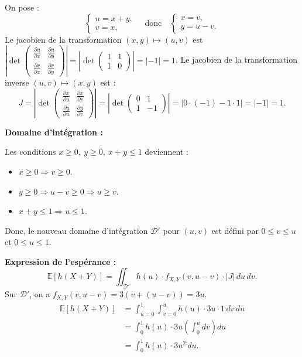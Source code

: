 {\begin{enumerate}
{			On pose :
			\[
			\begin{cases}
				u = x + y,\\
				v = x,
			\end{cases}
			\quad \text{donc} \quad
			\begin{cases}
				x = v,\\
				y = u - v.
			\end{cases}
			\]
			Le jacobien de la transformation $(x,y) \mapsto (u,v)$ est $\left| \det \begin{pmatrix} \frac{\partial u}{\partial x} & \frac{\partial u}{\partial y} \\ \frac{\partial v}{\partial x} & \frac{\partial v}{\partial y} \end{pmatrix} \right| = \left| \det \begin{pmatrix} 1 & 1 \\ 1 & 0 \end{pmatrix} \right| = |-1| = 1$.
			Le jacobien de la transformation inverse $(u,v) \mapsto (x,y)$ est :
			\[
			J = \left| \det
			\begin{pmatrix}
				\frac{\partial x}{\partial u} & \frac{\partial x}{\partial v} \\
				\frac{\partial y}{\partial u} & \frac{\partial y}{\partial v}
			\end{pmatrix}
			\right|
			= \left| \det
			\begin{pmatrix}
				0 & 1 \\
				1 & -1
			\end{pmatrix}
			\right| = |0 \cdot (-1) - 1 \cdot 1| = |-1| = 1.
			\]
			
			\textbf{Domaine d'intégration :}
			
			Les conditions $x \geq 0,\ y \geq 0,\ x+y \leq 1$ deviennent :
			\begin{itemize}
				\item $x \geq 0 \Rightarrow v \geq 0$.
				\item $y \geq 0 \Rightarrow u - v \geq 0 \Rightarrow u \geq v$.
				\item $x+y \leq 1 \Rightarrow u \leq 1$.
			\end{itemize}
			Donc, le nouveau domaine d'intégration $\mathcal{D}'$ pour $(u,v)$ est défini par $0 \leq v \leq u$ et $0 \leq u \leq 1$.
			
			\textbf{Expression de l'espérance :}
			\[
			\mathbb{E}[h(X+Y)]
			= \iint_{\mathcal{D}'} h(u)\cdot f_{X,Y}(v, u - v) \cdot |J|\, du\, dv.
			\]
			Sur $\mathcal{D}'$, on a $f_{X,Y}(v, u - v) = 3(v + (u - v)) = 3u$.
			\begin{align*}
			\mathbb{E}[h(X+Y)] &= \int_{u=0}^{1} \int_{v=0}^{u} h(u) \cdot 3u \cdot 1 \, dv\, du \\
				&= \int_0^1 h(u) \cdot 3u \left( \int_0^u dv \right) du \\
				&= \int_0^1 h(u) \cdot 3u^2 \, du.
			\end{align*}
			
}
\end{enumerate}}

